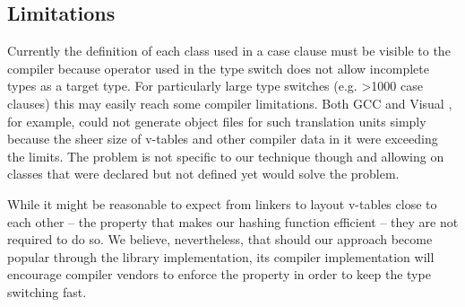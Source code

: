 \subsection{Limitations}
\label{sec:lim}

Currently the definition of each class used in a case clause must be visible to 
the compiler because  operator used in the type switch does 
not allow incomplete types as a target type. For particularly large type 
switches (e.g. \textgreater 1000 case clauses) this may easily reach some 
compiler limitations. Both GCC and Visual \Cpp{}, for example, could not generate 
object files for such translation units simply because the sheer size of v-tables 
and other compiler data in it were exceeding the limits. The problem is not 
specific to our technique though and allowing  on classes 
that were declared but not defined yet would solve the problem.

While it might be reasonable to expect from linkers to layout v-tables close 
to each other -- the property that makes our hashing function efficient -- they 
are not required to do so. We believe, nevertheless, that should our approach 
become popular through the library implementation, its compiler implementation 
will encourage compiler vendors to enforce the property in order to keep the 
type switching fast.

